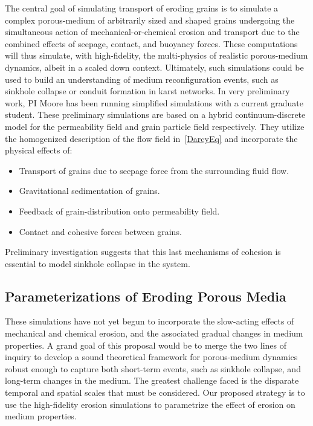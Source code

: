 \documentclass[11pt]{article}
\begin{document}
The central goal of simulating transport of eroding grains is to simulate a complex porous-medium of arbitrarily sized and shaped grains undergoing the simultaneous action of mechanical-or-chemical erosion and transport due to the combined effects of seepage, contact, and buoyancy forces. These computations will thus simulate, with high-fidelity, the multi-physics of realistic porous-medium dynamics, albeit in a scaled down context. Ultimately, such simulations could be used to build an understanding of medium reconfiguration events, such as sinkhole collapse or conduit formation in karst networks. In very preliminary work, PI Moore has been running simplified simulations with a current graduate student. These preliminary simulations are based on a hybrid continuum-discrete model for the permeability field and grain particle field respectively. They utilize the homogenized description of the flow field in~\eqref{DarcyEq} and incorporate the physical effects of: \begin{itemize}[noitemsep]
\item Transport of grains due to seepage force from the surrounding fluid flow.
\item Gravitational sedimentation of grains.
\item Feedback of grain-distribution onto permeability field.
\item Contact and cohesive forces between grains.
\end{itemize}
Preliminary investigation suggests that this last mechanisms of cohesion is essential to model sinkhole collapse in the system.

\subsection{Parameterizations of Eroding Porous Media}
These simulations have not yet begun to incorporate the slow-acting effects of mechanical and chemical erosion, and the associated gradual changes in medium properties. A grand goal of this proposal would be to merge the two lines of inquiry to develop a sound theoretical framework for porous-medium dynamics robust enough to capture both short-term events, such as sinkhole collapse, and long-term changes in the medium. The greatest challenge faced is the disparate temporal and spatial scales that must be considered. Our proposed strategy is to use the high-fidelity erosion simulations to parametrize the effect of erosion on medium properties.
\end{document}
